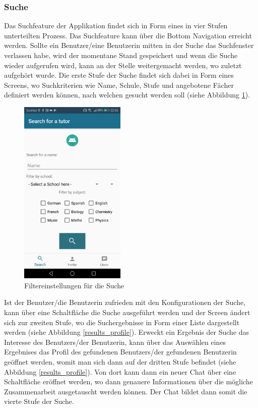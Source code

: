\documentclass[../main.tex]{subfiles}
\begin{document}
\subsubsection*{Suche}
Das Suchfeature der Applikation findet sich in Form eines in vier Stufen unterteilten Prozess. Das Suchfeature kann über die Bottom Navigation erreicht werden. Sollte ein Benutzer/eine Benutzerin mitten in der Suche das Suchfenster verlassen habe, wird der momentane Stand gespeichert und wenn die Suche wieder aufgerufen wird, kann an der Stelle weitergemacht werden, wo zuletzt aufgehört wurde. Die erste Stufe der Suche findet sich dabei in Form eines Screens, wo Suchkriterien wie Name, Schule, Stufe und angebotene Fächer definiert werden können, nach welchen gesucht werden soll (siehe Abbildung \ref{searchOverview}).
\begin{figure} 
	\centering
	\includegraphics[width=0.45\textwidth]{./images/searchfilter.png}
	\caption{Filtereinstellungen für die Suche}
	\label{searchOverview}
\end{figure} 
Ist der Benutzer/die Benutzerin zufrieden mit den Konfigurationen der Suche, kann über eine Schaltfläche die Suche ausgeführt werden und der Screen ändert sich zur zweiten Stufe, wo die Suchergebnisse in Form einer Liste dargestellt werden (siehe Abbildung \ref{results_profile}). Erweckt ein Ergebnis der Suche das Interesse des Benutzers/der Benutzerin, kann über das Auswählen eines Ergebnises das Profil des gefundenen Benutzers/der gefundenen Benutzerin geöffnet werden, womit man sich dann auf der dritten Stufe befindet (siehe Abbildung  \ref{results_profile}). Von dort kann dann ein neuer Chat über eine Schaltfläche eröffnet werden, wo dann genauere Informationen über die mögliche Zusammenarbeit ausgetauscht werden können. Der Chat bildet dann somit die vierte Stufe der Suche.
\end{document}
